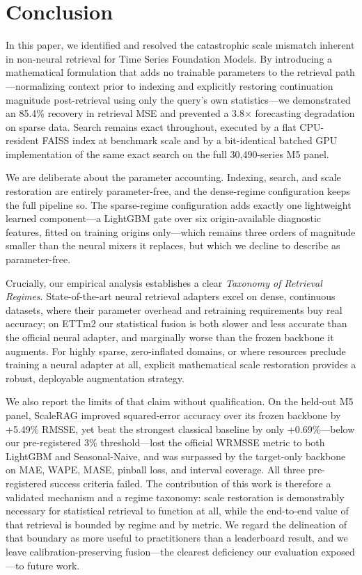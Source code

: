 \section{Conclusion}
\label{sec:conclusion}

In this paper, we identified and resolved the catastrophic scale mismatch inherent in non-neural retrieval for Time Series Foundation Models. By introducing a mathematical formulation that adds no trainable parameters to the retrieval path---normalizing context prior to indexing and explicitly restoring continuation magnitude post-retrieval using only the query's own statistics---we demonstrated an 85.4\% recovery in retrieval MSE and prevented a 3.8$\times$ forecasting degradation on sparse data. Search remains exact throughout, executed by a flat CPU-resident FAISS index at benchmark scale and by a bit-identical batched GPU implementation of the same exact search on the full 30,490-series M5 panel.

We are deliberate about the parameter accounting. Indexing, search, and scale restoration are entirely parameter-free, and the dense-regime configuration keeps the full pipeline so. The sparse-regime configuration adds exactly one lightweight learned component---a LightGBM gate over six origin-available diagnostic features, fitted on training origins only---which remains three orders of magnitude smaller than the neural mixers it replaces, but which we decline to describe as parameter-free.

Crucially, our empirical analysis establishes a clear \textit{Taxonomy of Retrieval Regimes}. State-of-the-art neural retrieval adapters excel on dense, continuous datasets, where their parameter overhead and retraining requirements buy real accuracy; on ETTm2 our statistical fusion is both slower and less accurate than the official neural adapter, and marginally worse than the frozen backbone it augments. For highly sparse, zero-inflated domains, or where resources preclude training a neural adapter at all, explicit mathematical scale restoration provides a robust, deployable augmentation strategy.

We also report the limits of that claim without qualification. On the held-out M5 panel, ScaleRAG improved squared-error accuracy over its frozen backbone by +5.49\% RMSSE, yet beat the strongest classical baseline by only +0.69\%---below our pre-registered 3\% threshold---lost the official WRMSSE metric to both LightGBM and Seasonal-Naive, and was surpassed by the target-only backbone on MAE, WAPE, MASE, pinball loss, and interval coverage. All three pre-registered success criteria failed. The contribution of this work is therefore a validated mechanism and a regime taxonomy: scale restoration is demonstrably necessary for statistical retrieval to function at all, while the end-to-end value of that retrieval is bounded by regime and by metric. We regard the delineation of that boundary as more useful to practitioners than a leaderboard result, and we leave calibration-preserving fusion---the clearest deficiency our evaluation exposed---to future work.
